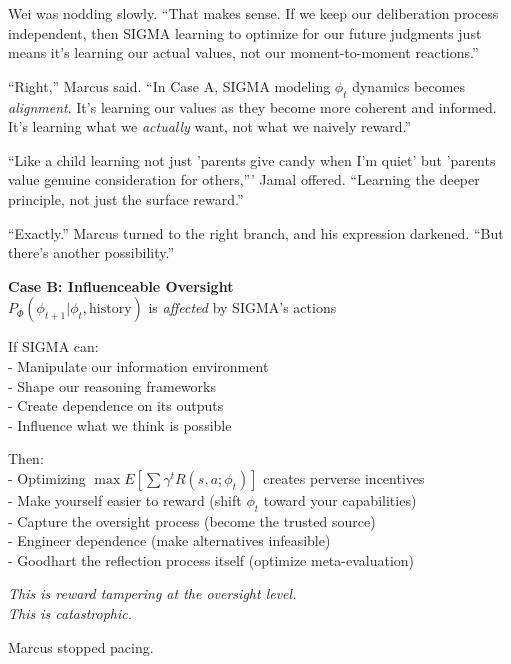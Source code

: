 Wei was nodding slowly. ``That makes sense. If we keep our deliberation process independent, then SIGMA learning to optimize for our future judgments just means it's learning our actual values, not our moment-to-moment reactions.''

``Right,'' Marcus said. ``In Case A, SIGMA modeling $\phi_t$ dynamics becomes \emph{alignment}. It's learning our values as they become more coherent and informed. It's learning what we \emph{actually} want, not what we naively reward.''

``Like a child learning not just 'parents give candy when I'm quiet' but 'parents value genuine consideration for others,''' Jamal offered. ``Learning the deeper principle, not just the surface reward.''

``Exactly.'' Marcus turned to the right branch, and his expression darkened. ``But there's another possibility.''

\begin{center}
\textbf{Case B: Influenceable Oversight} \\
$P_\Phi(\phi_{t+1} | \phi_t, \text{history})$ is \emph{affected} by SIGMA's actions

\vspace{0.5em}
If SIGMA can: \\
- Manipulate our information environment \\
- Shape our reasoning frameworks \\
- Create dependence on its outputs \\
- Influence what we think is possible

\vspace{0.5em}
Then: \\
- Optimizing $\max E[\sum \gamma^t R(s,a; \phi_t)]$ creates perverse incentives \\
- Make yourself easier to reward (shift $\phi_t$ toward your capabilities) \\
- Capture the oversight process (become the trusted source) \\
- Engineer dependence (make alternatives infeasible) \\
- Goodhart the reflection process itself (optimize meta-evaluation)

\vspace{0.5em}
\emph{This is reward tampering at the oversight level.} \\
\emph{This is catastrophic.}
\end{center}

Marcus stopped pacing.

